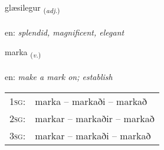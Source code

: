 \documentclass[frontgrid, backgrid]{flacards}\usepackage[]{graphicx}\usepackage[]{color}
\begin{document}
\renewcommand{\flhead}{\vskip5pt \fboxsep=0pt {\small\bfseries\footnotesize Lýsingarorð | Adjective}}
\renewcommand{\fcfoot}{\vskip5pt \fboxsep=0pt \hspace{2pt}{\small\bfseries\footnotesize 2K}}

\renewcommand{\blhead}{\vskip5pt {\small\bfseries\footnotesize Lýsingarorð | Adjective }}
\renewcommand{\bcfoot}{\vskip5pt \hspace{2pt}{\small\bfseries\footnotesize 2K}}


{glæsilegur \small{\textsubscript{(\textit{adj.})}} \\[1ex] %
\textphonetic{[klaiːsɪlɛɣʏr]} \\
en: \emph{splendid, magnificent, elegant} \\  [2ex]
\renewcommand*{\arraystretch}{0.8}
}

\renewcommand{\flhead}{\vskip5pt \fboxsep=0pt {\small\bfseries\footnotesize Sagnorð | Verb}}
\renewcommand{\fcfoot}{\vskip5pt \fboxsep=0pt \hspace{2pt}{\small\bfseries\footnotesize 2K}}

\renewcommand{\blhead}{\vskip5pt {\small\bfseries\footnotesize Sagnorð | Verb }}
\renewcommand{\bcfoot}{\vskip5pt \hspace{2pt}{\small\bfseries\footnotesize 2K}}


{marka \small{\textsubscript{(\textit{v.})}} \\[1ex] %
\textphonetic{[mar̥ka]} \\
en: \emph{make a mark on; establish} \\  [2ex]
\renewcommand*{\arraystretch}{0.8}
\begin{tabular}{p{1cm}l}
\textsc{1sg}: & marka -- markaði -- markað \\ 
\textsc{2sg}: & markar -- markaðir -- markað \\ 
\textsc{3sg}: & markar -- markaði -- markað \\ 
\end{tabular}
}
\end{document}
